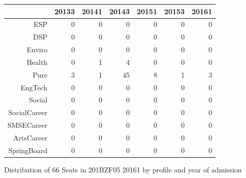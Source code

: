 \documentclass{article}\usepackage[]{graphicx}\usepackage[]{color}
\begin{document}
\begin{figure}[H]
\centering
\begin{tabular}{rrrrrrr}
  \hline
 & 20133 & 20141 & 20143 & 20151 & 20153 & 20161 \\ 
  \hline
ESP &   0 &   0 &   0 &   0 &   0 &   0 \\ 
  DSP &   0 &   0 &   0 &   0 &   0 &   0 \\ 
  Enviro &   0 &   0 &   0 &   0 &   0 &   0 \\ 
  Health &   0 &   1 &   4 &   0 &   0 &   0 \\ 
  Pure &   3 &   1 &  45 &   8 &   1 &   3 \\ 
  EngTech &   0 &   0 &   0 &   0 &   0 &   0 \\ 
  Social &   0 &   0 &   0 &   0 &   0 &   0 \\ 
  SocialCareer &   0 &   0 &   0 &   0 &   0 &   0 \\ 
  SMSECareer &   0 &   0 &   0 &   0 &   0 &   0 \\ 
  ArtsCareer &   0 &   0 &   0 &   0 &   0 &   0 \\ 
  SpringBoard &   0 &   0 &   0 &   0 &   0 &   0 \\ 
   \hline
\end{tabular}
\caption{Distribution of 66 Seats in 201BZF05 20161 by profile and year of admission} 
\end{figure}
\end{document}
